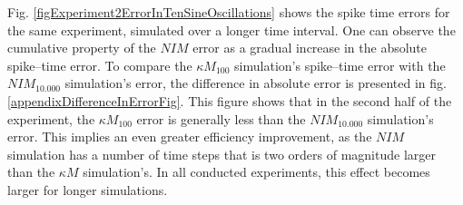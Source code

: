 	Fig. \ref{figExperiment2ErrorInTenSineOscillations} shows the spike time errors for the same experiment, simulated over a longer time interval. 
	One can observe the cumulative property of the $NIM$ error as a gradual increase in the absolute spike--time error. %
	To compare the $\kappa M_{100}$ simulation's spike--time error with the $NIM_{10.000}$ simulation's error, the difference in absolute error is presented in fig. \ref{appendixDifferenceInErrorFig}.
	This figure shows that in the second half of the experiment, the $\kappa M_{100}$ error is generally less than the $NIM_{10.000}$ simulation's error. %
	This implies an even greater efficiency improvement, as the $NIM$ simulation has a number of time steps that is two orders of magnitude larger than the $\kappa M$ simulation's.
	In all conducted experiments, this effect becomes larger for longer simulations.

